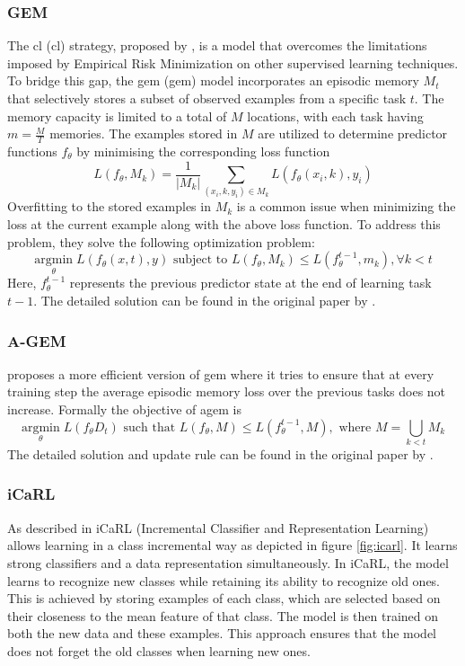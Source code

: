 \subsubsection{GEM}
\label{sec:gem}
The \acrlong{cl} (\acrshort{cl}) strategy, proposed by \citep{lopez2017gradient}, is a model that overcomes the limitations imposed by Empirical Risk Minimization \citep{vapnik1991principles} on other supervised learning techniques. To bridge this gap, the \acrlong{gem} (\acrshort{gem}) model incorporates an episodic memory $M_t$ that selectively stores a subset of observed examples from a specific task $t$. The memory capacity is limited to a total of $M$ locations, with each task having $m=\frac{M}{T}$ memories. The examples stored in $M$ are utilized to determine predictor functions $f_{\theta}$ by minimising the corresponding loss function
\[
L(f_{\theta}, M_{k}) = \frac{1}{|M_{k}|} \sum_{(x_i, k, y_i) \in M_{k}} L(f_{\theta}(x_i , k), y_i)
\]
Overfitting to the stored examples in $M_{k}$ is a common issue when minimizing the loss at the current example along with the above loss function. To address this problem, they solve the following optimization problem:
\[ 
\underset{\theta}{\mathrm{argmin }} \; L(f_{\theta}(x,t),y) \text{ subject to } L(f_{\theta}, M_{k}) \leq L(f_{\theta}^{t-1}, m_k), \forall k<t 
\]
Here, $f^{t-1}_{\theta}$ represents the previous predictor state at the end of learning task $t-1$. The detailed solution can be found in the original paper by \citep{lopez2017gradient}.


\subsubsection{A-GEM}
\label{sec:a-gem}
\citep{chaudhry2018efficient} proposes a more efficient version of \acrshort{gem} where it tries to ensure that at every training step the average episodic memory loss over the previous tasks does not increase. Formally the objective of \acrshort{agem} is
\[ 
\underset{\theta}{\mathrm{argmin }} \; L(f_{\theta} D_{t}) \text{ such that } L(f_{\theta}, M) \leq L(f_{\theta}^{t-1}, M), \text{ where } M = \underset{k<t}{\bigcup} M_{k} 
\]
The detailed solution and update rule can be found in the original paper by \citep{chaudhry2018efficient}.

\subsubsection{iCaRL}
As described in \citep{rebuffi2017icarl} iCaRL (Incremental Classifier and Representation Learning) allows learning in a class incremental way as depicted in figure \ref{fig:icarl}. It learns strong classifiers and a data representation simultaneously. In iCaRL, the model learns to recognize new classes while retaining its ability to recognize old ones. This is achieved by storing examples of each class, which are selected based on their closeness to the mean feature of that class. 
The model is then trained on both the new data and these examples. This approach ensures that the model does not forget the old classes when learning new ones. 


